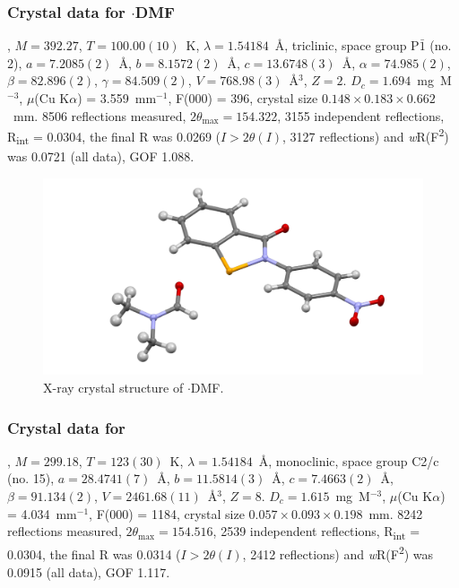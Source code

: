 \begin{refsection}
\subsubsection{Crystal data for \texorpdfstring{$ \cdot $DMF}{C16 H15 N3 O4 Se}}
, $M=392.27$, $T=100.00(10)$~K, $\lambda=1.54184$~\AA, triclinic, space group P$\bar{1}$ (no. 2), $a = 7.2085(2)$~\AA, $b = 8.1572(2)$~\AA, $c = 13.6748(3)$~\AA, $\alpha = 74.985(2)$\degree, $\beta = 82.896(2)$\degree, $\gamma = 84.509(2)$\degree, $V = 768.98(3)$~\AA$^{3}$, $Z = 2$. $D_{c}= 1.694$~mg~M$^{-3}$, $\mu$(Cu K$\alpha$) = 3.559~mm$^{-1}$, F(000) = 396, crystal size $0.148 \times 0.183 \times 0.662$~mm. 8506 reflections measured, $2\theta_{\max}=154.322$\degree, 3155 independent reflections, R\textsubscript{int} = 0.0304, the final R was 0.0269 ($I > 2\theta(I)$, 3127 reflections) and \textit{w}R(F\textsuperscript{2}) was 0.0721 (all data), GOF 1.088.

\begin{figure}
  \includegraphics[width=0.6\linewidth]{Figures/ebs-4no2-dmf-xtal.pdf}
  \caption{X-ray crystal structure of \texorpdfstring{$ \cdot $DMF}{C16 H15 N3 O4 Se}.}
\end{figure}

\subsubsection{Crystal data for \texorpdfstring{}{C14 H8 N2 O Se}}
, $M=299.18$, $T=123(30)$~K, $\lambda=1.54184$~\AA, monoclinic, space group C2/c (no. 15), $a = 28.4741(7)$~\AA, $b = 11.5814(3)$~\AA, $c = 7.4663(2)$~\AA, $\beta = 91.134(2)$\degree, $V = 2461.68(11)$~\AA$^{3}$, $Z = 8$. $D_{c}= 1.615$~mg~M$^{-3}$, $\mu$(Cu K$\alpha$) = 4.034~mm$^{-1}$, F(000) = 1184, crystal size $0.057 \times 0.093 \times 0.198$~mm. 8242 reflections measured, $2\theta_{\max}=154.516$\degree, 2539 independent reflections, R\textsubscript{int} = 0.0304, the final R was 0.0314 ($I > 2\theta(I)$, 2412 reflections) and \textit{w}R(F\textsuperscript{2}) was 0.0915 (all data), GOF 1.117.


\end{refsection}
